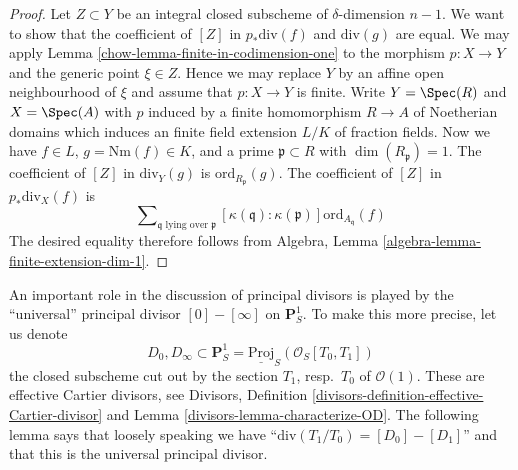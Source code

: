\begin{proof}

Let $Z \subset Y$ be an integral closed subscheme of $\delta$-dimension
$n - 1$. We want to show that the coefficient of $[Z]$ in
$p_*\text{div}(f)$ and $\text{div}(g)$ are equal. We may apply
Lemma \ref{chow-lemma-finite-in-codimension-one}
to the morphism $p : X \to Y$ and the generic point $\xi \in Z$.
Hence we may replace $Y$ by an
affine open neighbourhood of $\xi$ and assume that $p : X \to Y$ is finite.
Write $Y = \Spec(R)$ and $X = \Spec(A)$ with $p$ induced
by a finite homomorphism $R \to A$ of Noetherian domains which induces
an finite field extension $L/K$ of fraction fields.
Now we have $f \in L$, $g = \text{Nm}(f) \in K$,
and a prime $\mathfrak p \subset R$ with $\dim(R_{\mathfrak p}) = 1$.
The coefficient of $[Z]$ in $\text{div}_Y(g)$ is
$\text{ord}_{R_\mathfrak p}(g)$.
The coefficient of $[Z]$ in $p_*\text{div}_X(f)$ is
$$
\sum\nolimits_{\mathfrak q\text{ lying over }\mathfrak p}
[\kappa(\mathfrak q) : \kappa(\mathfrak p)]
\text{ord}_{A_{\mathfrak q}}(f)
$$
The desired equality therefore follows from
Algebra, Lemma \ref{algebra-lemma-finite-extension-dim-1}.
\end{proof}

An important role in the discussion of principal divisors
is played by the ``universal'' principal divisor $[0] - [\infty]$
on $\mathbf{P}^1_S$. To make this more precise, let us denote
\begin{equation}
\label{equation-zero-infty}
D_0, D_\infty \subset
\mathbf{P}^1_S = \underline{\text{Proj}}_S(\mathcal{O}_S[T_0, T_1])
\end{equation}
the closed subscheme cut out by the section $T_1$, resp.\ $T_0$
of $\mathcal{O}(1)$. These are effective Cartier divisors, see
Divisors, Definition \ref{divisors-definition-effective-Cartier-divisor}
and Lemma \ref{divisors-lemma-characterize-OD}.
The following lemma says that loosely speaking we have
``$\text{div}(T_1/T_0) = [D_0] - [D_1]$'' and that this is the
universal principal divisor.

